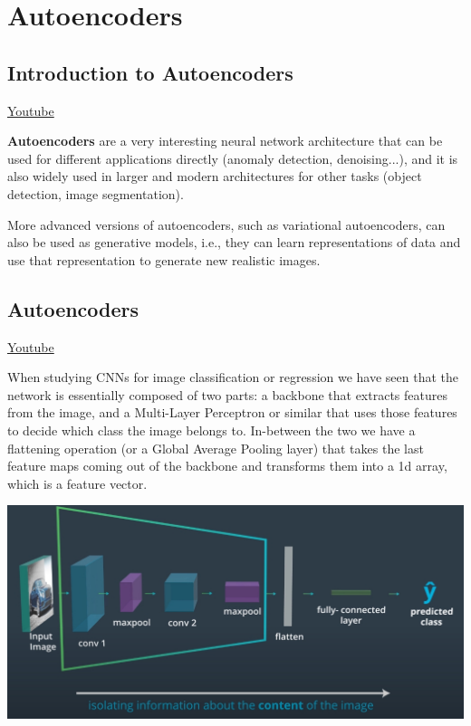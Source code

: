 \chapter{Autoencoders}

\section{Introduction to Autoencoders}
\href{https://www.youtube.com/watch?v=wxxsggRB4RE&ab_channel=Udacity}{Youtube} \newline

\textbf{Autoencoders} are a very interesting neural network architecture that can be used for different applications directly (anomaly detection, denoising...), and it is also widely used in larger and modern architectures for other tasks (object detection, image segmentation). \newline

More advanced versions of autoencoders, such as variational autoencoders, can also be used as generative models, i.e., they can learn representations of data and use that representation to generate new realistic images.

\section{Autoencoders}
\href{https://www.youtube.com/watch?v=a5zHMWOq0fc&ab_channel=Udacity}{Youtube} \newline

When studying CNNs for image classification or regression we have seen that the network is essentially composed of two parts: a backbone that extracts features from the image, and a Multi-Layer Perceptron or similar that uses those features to decide which class the image belongs to. In-between the two we have a flattening operation (or a Global Average Pooling layer) that takes the last feature maps coming out of the backbone and transforms them into a 1d array, which is a feature vector.

\includegraphics[width=1\linewidth]{img//cnn//autoencoders/cnn-structure-recap.jpeg}

